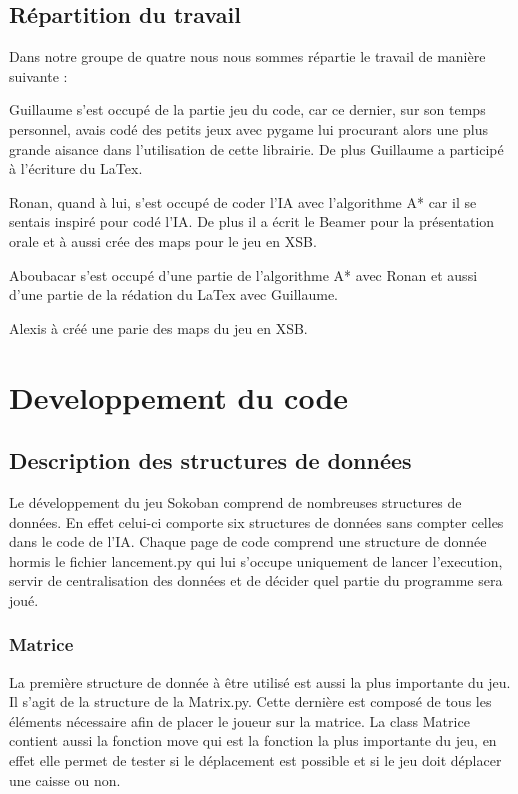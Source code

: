 \documentclass[a4paper,12pt]{article} %
\begin{document}
\subsection{Répartition du travail}

Dans notre groupe de quatre nous nous sommes répartie le travail de manière suivante : 

Guillaume s'est occupé de la partie jeu du code, car ce dernier, sur son temps personnel, avais codé des petits jeux avec pygame lui procurant alors une plus grande aisance dans l'utilisation de cette librairie.
De plus Guillaume a participé à l'écriture du LaTex.

Ronan, quand à lui, s'est occupé de coder l'IA avec l'algorithme A* car il se sentais inspiré pour codé l'IA.
De plus il a écrit le Beamer pour la présentation orale et à aussi crée des maps pour le jeu en XSB.

Aboubacar s'est occupé d'une partie de l'algorithme A* avec Ronan et aussi d'une partie de la rédation du LaTex avec Guillaume.

Alexis à créé une parie des maps du jeu en XSB.

\newpage

\section{Developpement du code}

\subsection{Description des structures de données}

Le développement du jeu Sokoban comprend de nombreuses structures de données.
En effet celui-ci comporte six structures de données sans compter celles dans le code de l'IA.
Chaque page de code comprend une structure de donnée hormis le fichier lancement.py qui lui s'occupe uniquement de lancer l'execution, servir de centralisation des données et de décider quel partie du programme sera joué.

\subsubsection{Matrice}

La première structure de donnée à être utilisé est aussi la plus importante du jeu.
Il s'agit de la structure de la Matrix.py.
Cette dernière est composé de tous les éléments nécessaire afin de placer le joueur sur la matrice.
La class Matrice contient aussi la fonction move qui est la fonction la plus importante du jeu, en effet elle permet de tester si le déplacement est possible et si le jeu doit déplacer une caisse ou non.
\end{document}
